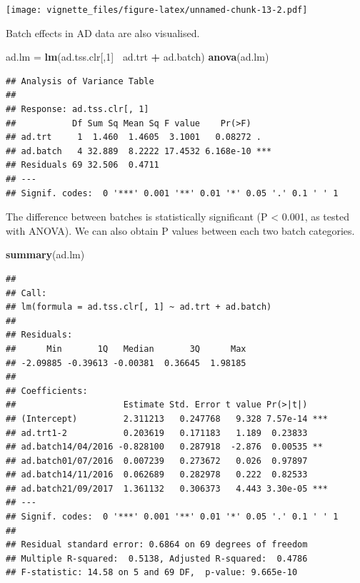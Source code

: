 \documentclass[]{book}
\newenvironment{Shaded}{\begin{snugshade}}{\end{snugshade}}
\newcommand{\KeywordTok}[1]{\textcolor[rgb]{0.13,0.29,0.53}{\textbf{#1}}}
\newcommand{\DecValTok}[1]{\textcolor[rgb]{0.00,0.00,0.81}{#1}}
\newcommand{\StringTok}[1]{\textcolor[rgb]{0.31,0.60,0.02}{#1}}
\newcommand{\OperatorTok}[1]{\textcolor[rgb]{0.81,0.36,0.00}{\textbf{#1}}}
\newcommand{\NormalTok}[1]{#1}
\begin{document}
\texttt{[image: vignette\_files/figure-latex/unnamed-chunk-13-2.pdf]}

Batch effects in AD data are also visualised.

\begin{Shaded}
\begin{Highlighting}[]
\NormalTok{ad.lm =}\StringTok{ }\KeywordTok{lm}\NormalTok{(ad.tss.clr[,}\DecValTok{1}\NormalTok{]}\OperatorTok{~}\StringTok{ }\NormalTok{ad.trt }\OperatorTok{+}\StringTok{ }\NormalTok{ad.batch)}
\KeywordTok{anova}\NormalTok{(ad.lm)}
\end{Highlighting}
\end{Shaded}

\begin{verbatim}
## Analysis of Variance Table
## 
## Response: ad.tss.clr[, 1]
##           Df Sum Sq Mean Sq F value    Pr(>F)    
## ad.trt     1  1.460  1.4605  3.1001   0.08272 .  
## ad.batch   4 32.889  8.2222 17.4532 6.168e-10 ***
## Residuals 69 32.506  0.4711                      
## ---
## Signif. codes:  0 '***' 0.001 '**' 0.01 '*' 0.05 '.' 0.1 ' ' 1
\end{verbatim}

The difference between batches is statistically significant (P
\textless{} 0.001, as tested with ANOVA). We can also obtain P values
between each two batch categories.

\begin{Shaded}
\begin{Highlighting}[]
\KeywordTok{summary}\NormalTok{(ad.lm)}
\end{Highlighting}
\end{Shaded}

\begin{verbatim}
## 
## Call:
## lm(formula = ad.tss.clr[, 1] ~ ad.trt + ad.batch)
## 
## Residuals:
##      Min       1Q   Median       3Q      Max 
## -2.09885 -0.39613 -0.00381  0.36645  1.98185 
## 
## Coefficients:
##                     Estimate Std. Error t value Pr(>|t|)    
## (Intercept)         2.311213   0.247768   9.328 7.57e-14 ***
## ad.trt1-2           0.203619   0.171183   1.189  0.23833    
## ad.batch14/04/2016 -0.828100   0.287918  -2.876  0.00535 ** 
## ad.batch01/07/2016  0.007239   0.273672   0.026  0.97897    
## ad.batch14/11/2016  0.062689   0.282978   0.222  0.82533    
## ad.batch21/09/2017  1.361132   0.306373   4.443 3.30e-05 ***
## ---
## Signif. codes:  0 '***' 0.001 '**' 0.01 '*' 0.05 '.' 0.1 ' ' 1
## 
## Residual standard error: 0.6864 on 69 degrees of freedom
## Multiple R-squared:  0.5138, Adjusted R-squared:  0.4786 
## F-statistic: 14.58 on 5 and 69 DF,  p-value: 9.665e-10
\end{verbatim}
\end{document}
